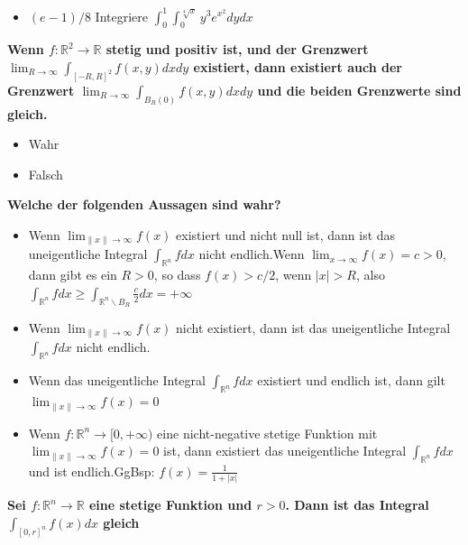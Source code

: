 \begin{flushleft}
\begin{itemize}[leftmargin = *]
\item[\textcolor{green}{W}] $(e-1) / 8$  \textcolor{Emerald}{Integriere $\int_0^1 \int_0^{\sqrt[4]{x}} y^3 e^{x^2} d y d x$}  
\end{itemize}

\textbf{
Wenn $f: \mathbb{R}^2 \rightarrow \mathbb{R}$ stetig und positiv ist, und der Grenzwert$
\lim _{R \rightarrow \infty} \int_{[-R, R]^2} f(x, y) d x d y$ existiert, dann existiert auch der Grenzwert $
\lim _{R \rightarrow \infty} \int_{B_R(0)} f(x, y) d x d y$ und die beiden Grenzwerte sind gleich.}

\begin{itemize}[leftmargin = *]
\item[\textcolor{green}{W}] Wahr  
\item[\textcolor{red}{F}] Falsch
\end{itemize}

\textbf{Welche der folgenden Aussagen sind wahr?}

\begin{itemize}[leftmargin = *]
\item[\textcolor{green}{W}] Wenn $\lim _{\|x\| \rightarrow \infty} f(x)$ existiert und nicht null ist, dann ist das uneigentliche Integral $\int_{\mathbb{R}^n} f d x$ nicht endlich.\textcolor{Emerald}{Wenn $\lim _{x \rightarrow \infty} f(x)=c>0$, dann gibt es ein $R>0$, so dass $f(x)>c / 2$, wenn $|x|>R$, also $\int_{\mathbb{R}^n} f d x \geq \int_{\mathbb{R}^n \backslash B_R} \frac{c}{2} d x=+\infty$}
\item[\textcolor{red}{F}] Wenn $\lim _{\|x\| \rightarrow \infty} f(x)$ nicht existiert, dann ist das uneigentliche Integral $\int_{\mathbb{R}^n} f d x$ nicht endlich.  
\item[\textcolor{red}{F}]   Wenn das uneigentliche Integral $\int_{\mathbb{R}^n} f d x$ existiert und endlich ist, dann gilt $\lim _{\|x\| \rightarrow \infty} f(x)=0$
\item[\textcolor{red}{F}] Wenn $f: \mathbb{R}^n \rightarrow[0,+\infty)$ eine nicht-negative stetige Funktion mit $\lim _{\|x\| \rightarrow \infty} f(x)=0$ ist, dann existiert das uneigentliche Integral $\int_{\mathbb{R}^n} f d x$ und ist endlich.\textcolor{Emerald}{GgBsp: $f(x)=\frac{1}{1+|x|}$}
\end{itemize}





\textbf{Sei $f: \mathbb{R}^n \rightarrow \mathbb{R}$ eine stetige Funktion und $r>0$. Dann ist das Integral$
\int_{[0, r]^n} f(x) d x$ gleich}


\end{flushleft}
